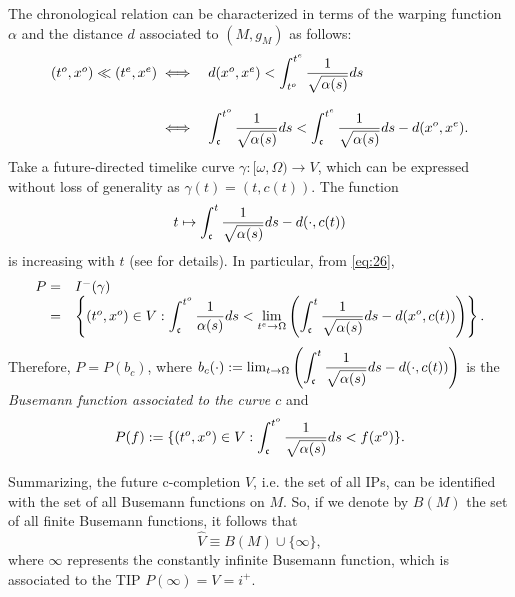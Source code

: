 The chronological relation can be characterized in terms of the warping function $\alpha$ and the distance $d$ associated to $(M,g_M)$ as follows:
\begin{equation}
  \label{eq:26}
  \begin{array}{rl}
    (t^o,x^o)\ll (t^e,x^e) \iff   & d(x^o,x^e)<\displaystyle\int_{t^o}^{t^e}\frac{1}{\sqrt{\alpha(s)}}ds \\ & \\
    \iff & \displaystyle \int_{\mathfrak{c}}^{t^o}\frac{1}{\sqrt{\alpha(s)}}ds<\int_{\mathfrak{c}}^{t^e}\frac{1}{\sqrt{\alpha(s)}}ds-d(x^o,x^e).
  \end{array}
\end{equation}
Take a future-directed timelike curve $\gamma:[\omega,\Omega)\rightarrow V$, which can be expressed without loss of generality as $\gamma(t)=(t,c(t))$. The function
\begin{equation}
  \label{eq:25}
t\mapsto \int_{\mathfrak{c}}^{t}\frac{1}{\sqrt{\alpha(s)}}ds-d(\cdot,c(t))
\end{equation}
is increasing with $t$ (see \cite[Prop. 3.1]{FHSIso2} for details). In particular, from \eqref{eq:26},
  \begin{equation}
    \label{eq:27}
  \begin{array}{rl}
      P=& I^-(\gamma)\\ = & \left\{(t^o,x^o)\in V:\displaystyle\int_{\mathfrak{c}}^{t^o}\frac{1}{\alpha(s)}ds<\lim_{t^e\rightarrow \Omega}\left(\int_{\mathfrak{c}}^{t}\frac{1}{\sqrt{\alpha(s)}}ds-d(x^o,c(t)) \right)\right\}.
    \end{array}
  \end{equation}
    Therefore, $P=P(b_{c})$, where $b_{c}(\cdot):=\lim_{t\rightarrow \Omega}\left(\displaystyle\int_{\mathfrak{c}}^{t}\frac{1}{\sqrt{\alpha(s)}}ds-d(\cdot,c(t)) \right)$ is the {\em Busemann function associated to the curve $c$} and
    \begin{equation}
      \label{eq:28}
     P(f):=\{ (t^o,x^o)\in V:\int_{\mathfrak{c}}^{t^o}\frac{1}{\sqrt{\alpha(s)}}ds<f(x^o)\}.
   \end{equation}

      Summarizing, the future c-completion $\hat{V}$, i.e. the set of all IPs, can be identified with the set of all Busemann functions on $M$. So, if we denote by $B(M)$ the set of all finite Busemann functions, it follows that
      \[
\hat{V}\equiv B(M)\cup \{\infty\},
        \]
where $\infty$ represents the constantly infinite Busemann function, which is associated to the TIP $P(\infty)=V=i^+$.

